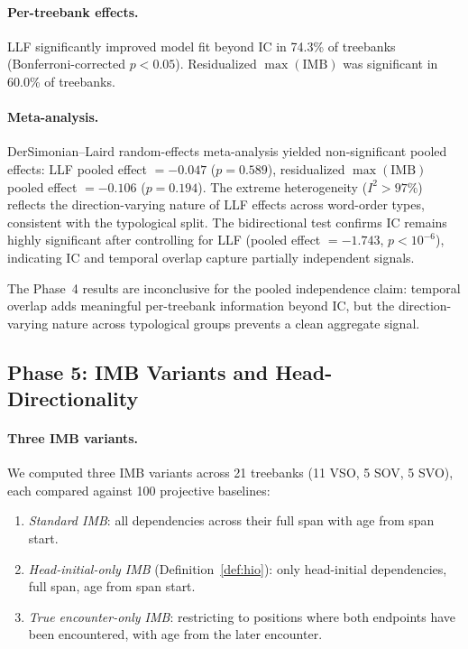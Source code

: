 \documentclass[11pt,letterpaper]{article}
\begin{document}
\paragraph{Per-treebank effects.} LLF significantly improved model fit beyond IC in 74.3\% of treebanks (Bonferroni-corrected $p < 0.05$). Residualized $\max(\text{IMB})$ was significant in 60.0\% of treebanks.

\paragraph{Meta-analysis.} DerSimonian--Laird random-effects meta-analysis yielded non-significant pooled effects: LLF pooled effect $= -0.047$ ($p = 0.589$), residualized $\max(\text{IMB})$ pooled effect $= -0.106$ ($p = 0.194$). The extreme heterogeneity ($I^2 > 97\%$) reflects the direction-varying nature of LLF effects across word-order types, consistent with the typological split. The bidirectional test confirms IC remains highly significant after controlling for LLF (pooled effect $= -1.743$, $p < 10^{-6}$), indicating IC and temporal overlap capture partially independent signals.

The Phase~4 results are inconclusive for the pooled independence claim: temporal overlap adds meaningful per-treebank information beyond IC, but the direction-varying nature across typological groups prevents a clean aggregate signal.


\subsection{Phase 5: IMB Variants and Head-Directionality}
\label{sec:imb_variants}

\paragraph{Three IMB variants.} We computed three IMB variants across 21 treebanks (11 VSO, 5 SOV, 5 SVO), each compared against 100 projective baselines:

\begin{enumerate}
  \item \emph{Standard IMB}: all dependencies across their full span with age from span start.
  \item \emph{Head-initial-only IMB} (Definition~\ref{def:hio}): only head-initial dependencies, full span, age from span start.
  \item \emph{True encounter-only IMB}: restricting to positions where both endpoints have been encountered, with age from the later encounter.
\end{enumerate}
\end{document}
